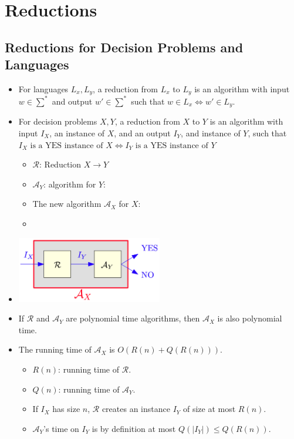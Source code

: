 \section{Reductions}

\subsection{Reductions for Decision Problems and Languages}
\begin{itemize}
    \item For languages $L_x, L_y$, a reduction from $L_x$ to $L_y$ is an algorithm with input $w \in \sum^\ast$ and output $w' \in \sum^\ast$ such that $w \in L_x \iff w' \in L_y$.
    \item For decision problems $X, Y$, a reduction from $X$ to $Y$ is an algorithm with input $I_X$, an instance of $X$, and an output $I_Y$, and instance of $Y$, such that $I_X \text{ is a YES instance of } X \iff I_Y \text{ is a YES instance of } Y$
    \begin{itemize}
        \item $\mathcal{R}$: Reduction $X \rightarrow Y$
        \item $\mathcal{A}_Y$: algorithm for $Y$:
        \item The new algorithm $\mathcal{A}_X$ for $X$:
        \item[] 
    \end{itemize}
    \item[] \begin{center}
        \includegraphics[width=0.5\textwidth]{lecture21/images/reduction.jpg}
    \end{center}
    \item If $\mathcal{R}$ and $\mathcal{A}_Y$ are polynomial time algorithms, then $\mathcal{A}_X$ is also polynomial time.
    \item The running time of $\mathcal{A}_X$ is $O(R(n) + Q(R(n)))$.
    \begin{itemize}
        \item $R(n)$: running time of $\mathcal{R}$.
        \item $Q(n)$: running time of $\mathcal{A}_Y$.
        \item If $I_X$ has size $n$, $\mathcal{R}$ creates an instance $I_Y$ of size at most $R(n)$.
        \item $\mathcal{A}_Y$'s time on $I_Y$ is by definition at most $Q(\left|I_Y\right|) \leq Q(R(n))$.
    \end{itemize}
\end{itemize}

